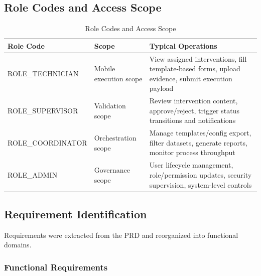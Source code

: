 \subsection{Role Codes and Access Scope}

\begin{table}[H]
\centering
\caption{Role Codes and Access Scope}
\label{tab:role_codes_scope}
\begin{tabularx}{\textwidth}{|l|X|X|}
\hline
\textbf{Role Code} & \textbf{Scope} & \textbf{Typical Operations} \\
\hline
ROLE\_TECHNICIAN & Mobile execution scope & View assigned interventions, fill template-based forms, upload evidence, submit execution payload \\
\hline
ROLE\_SUPERVISOR & Validation scope & Review intervention content, approve/reject, trigger status transitions and notifications \\
\hline
ROLE\_COORDINATOR & Orchestration scope & Manage templates/config export, filter datasets, generate reports, monitor process throughput \\
\hline
ROLE\_ADMIN & Governance scope & User lifecycle management, role/permission updates, security supervision, system-level controls \\
\hline
\end{tabularx}
\end{table}

\subsection{Requirement Identification}

Requirements were extracted from the PRD and reorganized into functional domains.

\subsubsection{Functional Requirements}

